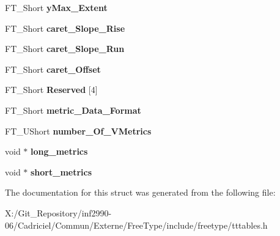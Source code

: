 \begin{DoxyCompactItemize}
\item 
\hypertarget{struct_t_t___vert_header___af6927e95c1dfbe90c2e76b1eef521d53}{F\-T\-\_\-\-Short {\bfseries y\-Max\-\_\-\-Extent}}\label{struct_t_t___vert_header___af6927e95c1dfbe90c2e76b1eef521d53}

\item 
\hypertarget{struct_t_t___vert_header___a3218533a7d8ac5a8ebd70a970cbdbbcc}{F\-T\-\_\-\-Short {\bfseries caret\-\_\-\-Slope\-\_\-\-Rise}}\label{struct_t_t___vert_header___a3218533a7d8ac5a8ebd70a970cbdbbcc}

\item 
\hypertarget{struct_t_t___vert_header___a98ff91b532d827440f7140d3071d473d}{F\-T\-\_\-\-Short {\bfseries caret\-\_\-\-Slope\-\_\-\-Run}}\label{struct_t_t___vert_header___a98ff91b532d827440f7140d3071d473d}

\item 
\hypertarget{struct_t_t___vert_header___a89ff9369f61dc5b770cde0eda954d402}{F\-T\-\_\-\-Short {\bfseries caret\-\_\-\-Offset}}\label{struct_t_t___vert_header___a89ff9369f61dc5b770cde0eda954d402}

\item 
\hypertarget{struct_t_t___vert_header___a54930b56bb8be0a8eb22753a9242fc5f}{F\-T\-\_\-\-Short {\bfseries Reserved} \mbox{[}4\mbox{]}}\label{struct_t_t___vert_header___a54930b56bb8be0a8eb22753a9242fc5f}

\item 
\hypertarget{struct_t_t___vert_header___aa7c3983f62f7bf736eaaaae684b65dd7}{F\-T\-\_\-\-Short {\bfseries metric\-\_\-\-Data\-\_\-\-Format}}\label{struct_t_t___vert_header___aa7c3983f62f7bf736eaaaae684b65dd7}

\item 
\hypertarget{struct_t_t___vert_header___a4ca6fe9cdd12fbc9a1129c4fbf6bddd1}{F\-T\-\_\-\-U\-Short {\bfseries number\-\_\-\-Of\-\_\-\-V\-Metrics}}\label{struct_t_t___vert_header___a4ca6fe9cdd12fbc9a1129c4fbf6bddd1}

\item 
\hypertarget{struct_t_t___vert_header___ac789245d0d6243bc965ad43702bdc671}{void $\ast$ {\bfseries long\-\_\-metrics}}\label{struct_t_t___vert_header___ac789245d0d6243bc965ad43702bdc671}

\item 
\hypertarget{struct_t_t___vert_header___ad5e875c19a02b0f6777db1c122bff2f3}{void $\ast$ {\bfseries short\-\_\-metrics}}\label{struct_t_t___vert_header___ad5e875c19a02b0f6777db1c122bff2f3}

\end{DoxyCompactItemize}


The documentation for this struct was generated from the following file\-:\begin{DoxyCompactItemize}
\item 
X\-:/\-Git\-\_\-\-Repository/inf2990-\/06/\-Cadriciel/\-Commun/\-Externe/\-Free\-Type/include/freetype/tttables.\-h\end{DoxyCompactItemize}
